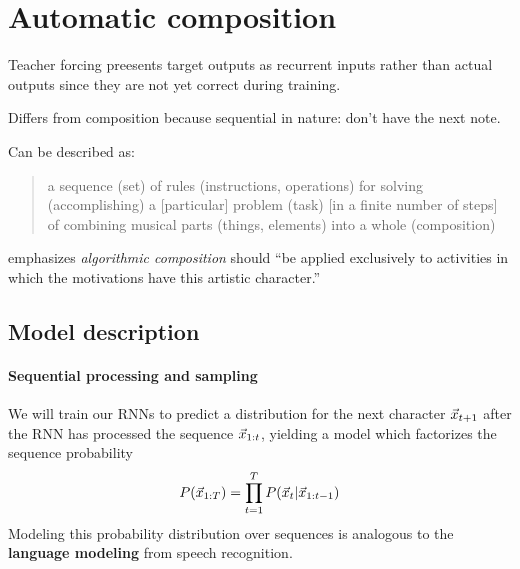 \documentclass[dissertation.tex]{subfiles}
\begin{document}
\chapter{Automatic composition}

Teacher forcing \cite{williams1989learning} preesents target outputs as
recurrent inputs rather than actual outputs since they are not yet correct
during training.

Differs from composition because sequential in nature: don't have the next note.

Can be described\cite{papadopoulos1999ai} as:

\begin{quote}
  a sequence (set) of rules (instructions, operations) for solving (accomplishing) a [particular] problem (task)
  [in a finite number of steps] of combining musical parts (things, elements) into a whole (composition)
\end{quote}

\cite{pearce2002motivations} emphasizes \emph{algorithmic composition} should ``be applied exclusively
to activities in which the motivations have this artistic character.''



\section{Model description}

\subsubsection{Sequential processing and sampling}

We will train our RNNs to predict a distribution for the next character
$\vec{x}_{t+1}$ after the RNN has processed the sequence $\vec{x}_{1:t}$,
yielding a model which factorizes the sequence probability
\begin{equation}
    P(\vec{x}_{1:T}) = \prod_{t=1}^T P(\vec{x}_t | \vec{x}_{1:t-1} )
\end{equation}
Modeling this probability distribution over sequences is analogous to the
\textbf{language modeling} from speech recognition.
\end{document}
